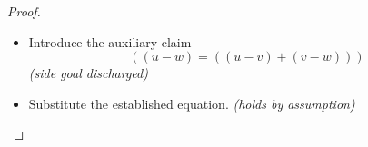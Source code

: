 \documentclass[11pt]{article}
\theoremstyle{plain}
\begin{document}
\begin{proof}
\begin{itemize}[leftmargin=2.8em, itemsep=4pt, parsep=1pt]
  \item[\textbf{54--55}] Introduce the auxiliary claim
\begin{equation*}
((u - w) = ((u - v) + (v - w)))
\end{equation*}
  \emph{(side goal discharged)}
  \item[\textbf{56--57}] Substitute the established equation.  \emph{(holds by assumption)}
\end{itemize}
\end{proof}
\end{document}
